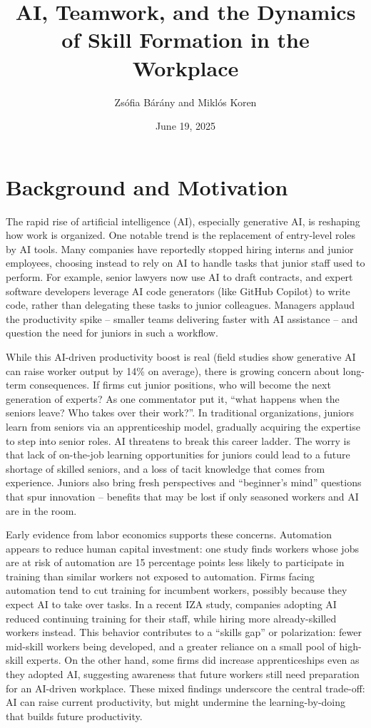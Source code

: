 \documentclass[12pt]{article}
\title{AI, Teamwork, and the Dynamics of Skill Formation in the Workplace}
\author{Zsófia Bárány and Miklós Koren}
\date{June 19, 2025}
\begin{document}
\maketitle
\section{Background and Motivation}\label{background-and-motivation}

The rapid rise of artificial intelligence (AI), especially generative
AI, is reshaping how work is organized. One notable trend is the
{replacement of entry-level roles by AI tools}. Many companies
have reportedly stopped hiring interns and junior employees, choosing
instead to rely on AI to handle tasks that junior staff used to perform.
For example, {senior lawyers now use AI to draft contracts}, and
{expert software developers leverage AI code generators (like
GitHub Copilot) to write code}, rather than delegating these tasks to
junior colleagues. Managers applaud the productivity spike --
{smaller teams delivering faster with AI assistance} -- and
question the need for juniors in such a workflow.

While this {AI-driven productivity boost} is real (field studies
show generative AI can raise worker output by 14\% on average), there is
growing concern about {long-term consequences}. If firms cut
junior positions, {who will become the next generation of experts?}
As one commentator put it, {``what happens when the seniors leave?
Who takes over their work?''}. In traditional organizations, juniors
learn from seniors via an {apprenticeship model}, gradually
acquiring the expertise to step into senior roles. AI threatens to break
this {career ladder}. The worry is that {lack of
on-the-job learning opportunities} for juniors could lead to a future
shortage of skilled seniors, and a loss of tacit knowledge that comes
from experience. Juniors also bring fresh perspectives and ``beginner's
mind'' questions that spur innovation -- benefits that may be lost if
only seasoned workers and AI are in the room.

Early evidence from labor economics supports these concerns.
{Automation appears to reduce human capital investment:} one
study finds workers whose jobs are at risk of automation are {15
percentage points less likely to participate in training} than similar
workers not exposed to automation. Firms facing automation tend to
{cut training for incumbent workers}, possibly because they
expect AI to take over tasks. In a recent IZA study, companies adopting
AI reduced continuing training for their staff, while hiring more
already-skilled workers instead. This behavior contributes to a
{``skills gap''} or polarization: fewer mid-skill workers being
developed, and a greater reliance on a small pool of high-skill experts.
On the other hand, some firms did increase {apprenticeships} even
as they adopted AI, suggesting awareness that {future workers still
need preparation for an AI-driven workplace}. These mixed findings
underscore the central trade-off: AI can raise current productivity, but
might undermine the {learning-by-doing} that builds future
productivity.
\end{document}
